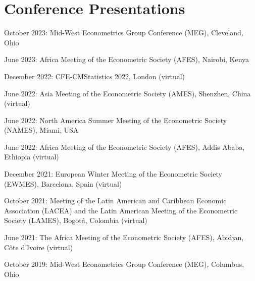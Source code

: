 \documentclass[12pt,letterpaper]{article}
\renewenvironment{itemize}{
  \begin{list}{}{
    \setlength{\leftmargin}{1.5em}
  }
}{
  \end{list}
}
\begin{document}
\section*{Conference Presentations}
\begin{itemize}
  \item October 2023: Mid-West Econometrics Group Conference (MEG), Cleveland, Ohio
  \item June 2023: Africa Meeting of the Econometric Society (AFES), Nairobi, Kenya
  \item December 2022: CFE-CMStatistics 2022, London (virtual)
  \item June 2022: Asia Meeting of the Econometric Society (AMES), Shenzhen, China (virtual)
  \item June 2022: North America Summer Meeting of the Econometric Society (NAMES), Miami, USA
  \item June 2022: Africa Meeting of the Econometric Society (AFES), Addis Ababa, Ethiopia (virtual)
  \item December 2021: European Winter Meeting of the Econometric Society (EWMES), Barcelona, Spain (virtual)
  \item October 2021: Meeting of the Latin American and Caribbean Economic Association (LACEA) and the Latin American Meeting of the Econometric Society (LAMES), Bogotá, Colombia (virtual)
	\item June 2021: The Africa Meeting of the Econometric Society (AFES), Abidjan, C\^ote d'Ivoire (virtual)
	\item October 2019: Mid-West Econometrics Group Conference (MEG), Columbus, Ohio
\end{itemize}
\end{document}
